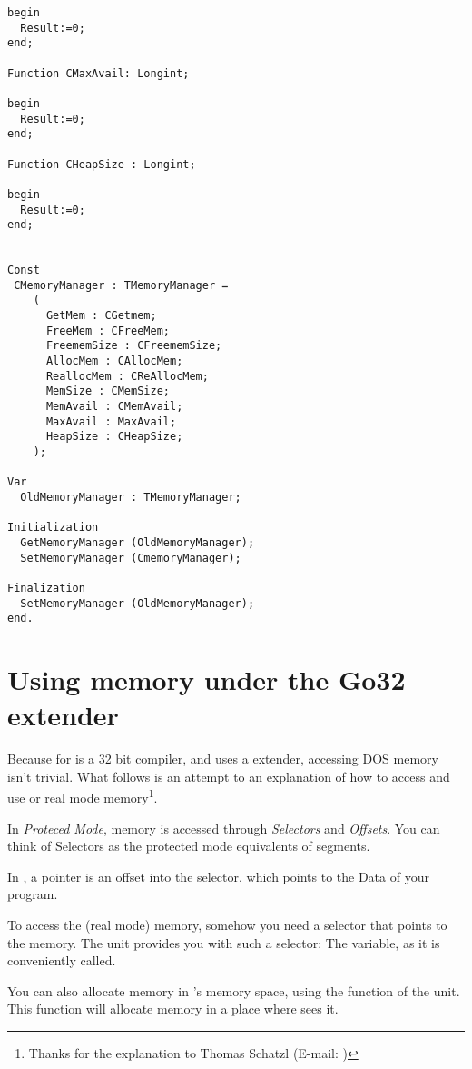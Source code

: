 {\begin{verbatim}
begin
  Result:=0;
end;

Function CMaxAvail: Longint;

begin
  Result:=0;
end;

Function CHeapSize : Longint;

begin
  Result:=0;
end;


Const
 CMemoryManager : TMemoryManager =
    (
      GetMem : CGetmem;
      FreeMem : CFreeMem;
      FreememSize : CFreememSize;
      AllocMem : CAllocMem;
      ReallocMem : CReAllocMem;
      MemSize : CMemSize;
      MemAvail : CMemAvail;
      MaxAvail : MaxAvail;
      HeapSize : CHeapSize;
    );

Var
  OldMemoryManager : TMemoryManager;

Initialization
  GetMemoryManager (OldMemoryManager);
  SetMemoryManager (CmemoryManager);

Finalization
  SetMemoryManager (OldMemoryManager);
end.
\end{verbatim}

\section{Using \dos memory under the Go32 extender}
\label{se:AccessingDosMemory}

Because \fpc for \dos is a 32 bit compiler, and uses a \dos extender, accessing DOS
memory isn't trivial. What follows is an attempt to an explanation of how to
access and use \dos or real mode memory\footnote{Thanks for the explanation to
Thomas Schatzl (E-mail: )}.

In {\em Proteced Mode}, memory is accessed through {\em Selectors} and
{\em Offsets}. You can think of Selectors as the protected mode
equivalents of segments.

In \fpc, a pointer is an offset into the  selector, which points to
the Data of your program.

To access the (real mode) \dos memory, somehow you need a selector that
points to the \dos memory.
The  unit provides you with such a selector: The
 variable, as it is conveniently called.

You can also allocate memory in \dos's memory space, using the
 function of the  unit.
This function will allocate memory in a place where \dos sees it.

}
